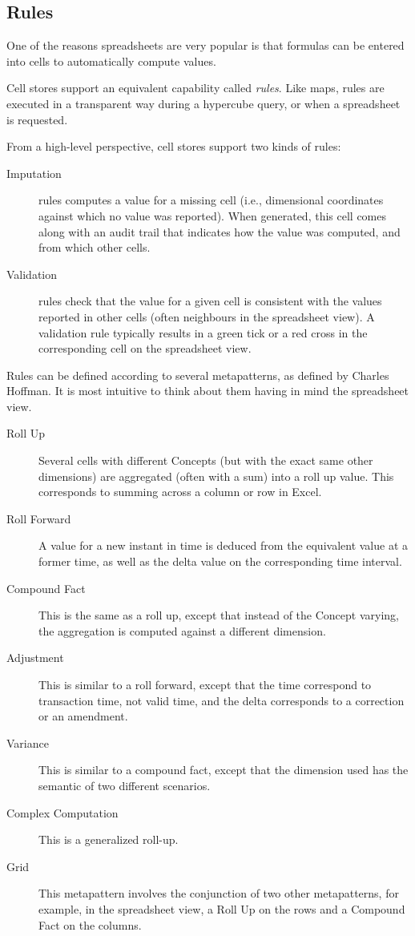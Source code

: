 \documentclass{acm_proc_article-sp}
\begin{document}
\subsection{Rules}

One of the reasons spreadsheets are very popular is that formulas can be entered into cells to automatically compute values.

Cell stores support an equivalent capability called \emph{rules}. Like maps, rules are executed in a transparent way during a hypercube query, or when a spreadsheet is requested.

From a high-level perspective, cell stores support two kinds of rules:

\begin{description}
\item[Imputation] rules computes a value for a missing cell (i.e., dimensional coordinates against which no value was reported). When generated, this cell comes along with an audit trail that indicates how the value was computed, and from which other cells.
\item[Validation] rules check that the value for a given cell is consistent with the values reported in other cells (often neighbours in the spreadsheet view). A validation rule typically results in a green tick or a red cross in the corresponding cell on the spreadsheet view.
\end{description}

Rules can be defined according to several metapatterns, as defined by Charles Hoffman. It is most intuitive to think about them having in mind the spreadsheet view.

\begin{description}
\item [Roll Up] Several cells with different Concepts (but with the exact same other dimensions) are aggregated (often with a sum) into a roll up value. This corresponds to summing across a column or row in Excel.
\item [Roll Forward] A value for a new instant in time is deduced from the equivalent value at a former time, as well as the delta value on the corresponding time interval.
\item [Compound Fact] This is the same as a roll up, except that instead of the Concept varying, the aggregation is computed against a different dimension.
\item [Adjustment] This is similar to a roll forward, except that the time correspond to transaction time, not valid time, and the delta corresponds to a correction or an amendment.
\item [Variance] This is similar to a compound fact, except that the dimension used has the semantic of two different scenarios.
\item [Complex Computation] This is a generalized roll-up.
\item [Grid] This metapattern involves the conjunction of two other metapatterns, for example, in the spreadsheet view, a Roll Up on the rows and a Compound Fact on the columns.
\end{description}
\end{document}
